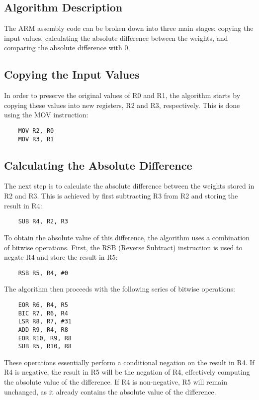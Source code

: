 \begin{enumerate}
\section{Algorithm Description}

The ARM assembly code can be broken down into three main stages: copying the input values, calculating the absolute difference between the weights, and comparing the absolute difference with 0.

\subsection{Copying the Input Values}

In order to preserve the original values of R0 and R1, the algorithm starts by copying these values into new registers, R2 and R3, respectively. This is done using the MOV instruction:

\begin{verbatim}
    MOV R2, R0
    MOV R3, R1
\end{verbatim}

\subsection{Calculating the Absolute Difference}

The next step is to calculate the absolute difference between the weights stored in R2 and R3. This is achieved by first subtracting R3 from R2 and storing the result in R4:

\begin{verbatim}
    SUB R4, R2, R3
\end{verbatim}

To obtain the absolute value of this difference, the algorithm uses a combination of bitwise operations. First, the RSB (Reverse Subtract) instruction is used to negate R4 and store the result in R5:

\begin{verbatim}
    RSB R5, R4, #0
\end{verbatim}

The algorithm then proceeds with the following series of bitwise operations:

\begin{verbatim}
    EOR R6, R4, R5
    BIC R7, R6, R4
    LSR R8, R7, #31
    ADD R9, R4, R8
    EOR R10, R9, R8
    SUB R5, R10, R8
\end{verbatim}

These operations essentially perform a conditional negation on the result in R4. If R4 is negative, the result in R5 will be the negation of R4, effectively computing the absolute value of the difference. If R4 is non-negative, R5 will remain unchanged, as it already contains the absolute value of the difference.


\end{enumerate}
